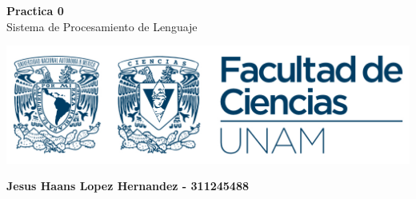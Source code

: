 \begin{titlepage}
    \begin{center}
    {\fontsize{40}{48}\selectfont \bfseries Practica 0} 
    \\\vspace{20pt}
    {\LARGE Sistema de Procesamiento de Lenguaje} \\
    \vspace{20pt}
    
    \vfill %

        \includegraphics[width=1\textwidth]{Images/Logo_FC_Color.jpg}

        \vfill %
        \textbf{Jesus Haans Lopez Hernandez - 311245488}

    \end{center}
\end{titlepage}
